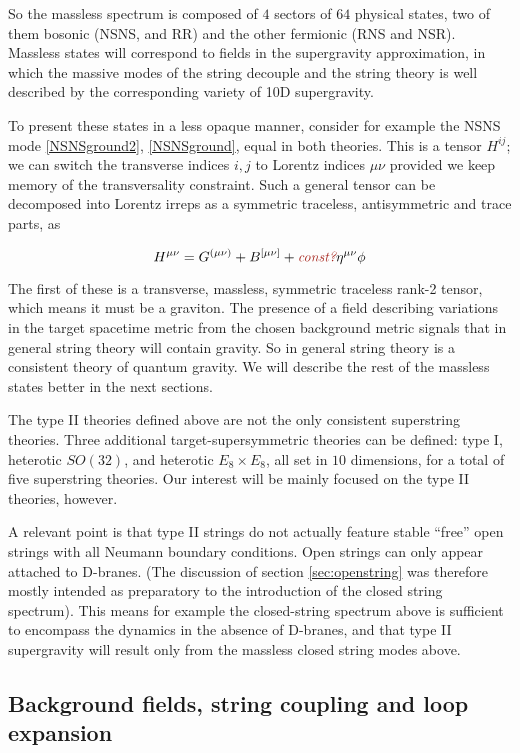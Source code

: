 So the massless spectrum is composed of $4$ sectors of $64$ physical states, two of them bosonic (NSNS, and RR) and the other fermionic (RNS and NSR). Massless states will correspond to fields in the supergravity approximation, in which the massive modes of the string decouple and the string theory is well described by the corresponding variety of 10D supergravity.

To present these states in a less opaque manner, consider for example the NSNS mode \eqref{NSNSground2}, \eqref{NSNSground}, equal in both theories. This is a tensor $H^{ij}$; we can switch the transverse indices $i,j$ to Lorentz indices $\mu\nu$ provided we keep memory of the transversality constraint. Such a general tensor can be decomposed into Lorentz irreps as a symmetric traceless, antisymmetric and trace parts, as

\begin{equation}
	H^{\mu\nu} = G^{(\mu\nu)} + B^{[\mu\nu]} + \cmmnt{\text{const?}} \eta^{\mu\nu} \phi
	\label{}
\end{equation}

The first of these is a transverse, massless, symmetric traceless rank-2 tensor, which means it must be a graviton. The presence of a field describing variations in the target spacetime metric from the chosen background metric signals that in general string theory will contain gravity. So in general string theory is a consistent theory of quantum gravity. We will describe the rest of the massless states better in the next sections.

The type II theories defined above are not the only consistent superstring theories. Three additional target-supersymmetric theories can be defined: type I, heterotic $SO(32)$, and heterotic $E_8\times E_8$, all set in $10$ dimensions, for a total of five superstring theories. Our interest will be mainly focused on the type II theories, however.

A relevant point is that type II strings do not actually feature stable ``free'' open strings with all Neumann boundary conditions. Open strings can only appear attached to D-branes. (The discussion of section \ref{sec:openstring} was therefore mostly intended as preparatory to the introduction of the closed string spectrum). This means for example the closed-string spectrum above is sufficient to encompass the dynamics in the absence of D-branes, and that type II supergravity will result only from the massless closed string modes above.

\subsection{Background fields, string coupling and loop expansion}

